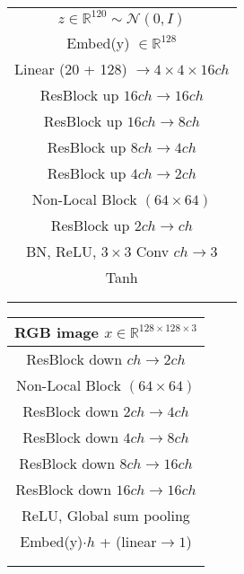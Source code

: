 \documentclass[10pt,twocolumn,letterpaper]{article}
\begin{document}
\begin{table*}[t]
	\vspace{-1em}
	\setlength{\tabcolsep}{0.25em}
	\renewcommand{\arraystretch}{1.5}
	\centering


	\begin{minipage}[t]{.45\textwidth}
	\centering
	\begin{tabular}{c}
	\hline 	\hline
    $z \in \mathbb{R}^{120}  \sim \mathcal{N}(0,I)$ \\
	Embed(y) $\in \mathbb{R}^{128}$\\
	\hline
	Linear (20 + 128) $\rightarrow 4 \times 4 \times 16ch$ \\
	\hline
	ResBlock up $16ch \rightarrow  16ch$ \\
	\hline
	ResBlock up $16ch \rightarrow  8ch$ \\
	\hline
	ResBlock up $8ch \rightarrow  4ch$ \\
	\hline
	ResBlock up $4ch \rightarrow  2ch$ \\
	\hline
	Non-Local Block $(64 \times 64)$ \\
	\hline
	ResBlock up $2ch \rightarrow  ch$ \\
	\hline
	BN, ReLU, $3 \times 3$ Conv $ch \rightarrow 3 $ \\
	\hline
	Tanh \\
	\hline 	\hline \\ \\
     \end{tabular}
\end{minipage} \hspace{0.5cm}	\begin{minipage}[t]{.45\textwidth}
\centering
{}
\begin{tabular}{c}
	\hline 	\hline
	RGB image $x \in \mathbb{R}^{128 \times 128 \times 3}$ \\
	\hline
	ResBlock down $ch \rightarrow  2ch$ \\
	\hline
	Non-Local Block $(64 \times 64)$ \\
	\hline
	ResBlock down $2ch \rightarrow  4ch$ \\
	\hline
	ResBlock down $4ch \rightarrow  8ch$ \\
	\hline
	ResBlock down $8ch \rightarrow  16ch$ \\
	\hline
	ResBlock down $16ch \rightarrow 16ch$ \\
	\hline
	ReLU, Global sum pooling \\
	\hline
	Embed(y)$\cdot h$ + (linear$\rightarrow 1$)	 \\
	\hline 	\hline \\ \\
\end{tabular}\end{minipage}



\end{table*}
\end{document}
